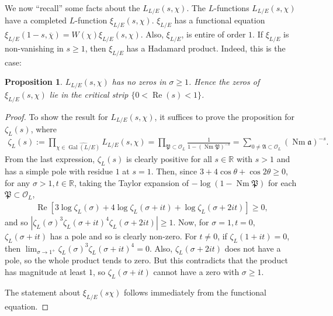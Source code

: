 \documentclass[12pt]{amsart}
\newtheorem{prop}[thm]{Proposition}
\theoremstyle{definition}
\theoremstyle{remark}
\numberwithin{equation}{section}
\newcommand{\cO}{\mathcal O}
\newcommand{\fka}{\mathfrak a}
\newcommand{\fkA}{\mathfrak{A}}
\newcommand{\fkP}{\mathfrak{P}}
\newcommand{\bbR}{\mathbb R}
\DeclareMathOperator{\norm}{Nm}
\DeclareMathOperator{\re}{Re}
\DeclareMathOperator{\Gal}{Gal}
\begin{document}
We now ``recall'' some facts about the $L_{L/E}(s,\chi)$.
The $L$-functions $L_{L/E}(s,\chi)$ have a completed $L$-function $\xi_{L/E}(s,\chi)$. $\xi_{L/E}$ has a functional equation $\xi_{L/E}(1-s, \overline{\chi}) = W(\chi) \xi_{L/E}(s,\chi)$. Also, $\xi_{L/E}$, is entire of order $1$. If $\xi_{L/E}$ is non-vanishing in $s \geq 1$, then $\xi_{L/E}$ has a Hadamard product. Indeed, this is the case:

\begin{prop} \label{prop:EasyZeroFreeRegion}
$L_{L/E}(s,\chi)$ has no zeros in $\sigma \geq 1$. Hence the zeros of $\xi_{L/E}(s,\chi)$ lie in the critical strip $\{0 < \re(s) < 1\}$. 
\end{prop}

\begin{proof}
To show the result for $L_{L/E}(s,\chi)$, it suffices to prove the proposition for $\zeta_{L}(s)$, where 
\begin{align}
\zeta_{L}(s):= \prod_{\chi \in \widehat{\Gal(L/E)}}L_{L/E}(s,\chi) = \prod_{\fkP \subset \cO_{L}} \frac{1}{1 - (\norm \fkP)^{-s}} = \sum_{0 \neq \fkA \subset \cO_{L}} (\norm \fka)^{-s}.
\end{align}
From the last expression, $\zeta_{L}(s)$ is clearly positive %
 for all $s \in \bbR$ with $s > 1$ and has a simple pole with residue $1$ at $s = 1$. Then, since $3 + 4 \cos \theta + \cos 2\theta \geq 0$, for any $\sigma > 1, t \in \bbR$, taking the Taylor expansion of $-\log(1-\norm \fkP)$ for each $\fkP \subset \cO_{L}$,
\begin{align}
\re\left[3 \log \zeta_{L}(\sigma) + 4 \log \zeta_{L}(\sigma + it) + \log\zeta_{L}(\sigma + 2it)\right] \geq 0,
\end{align}
and so $|\zeta_{L}(\sigma)^3 \zeta_{L}(\sigma + it)^4 \zeta_{L}(\sigma + 2it)| \geq 1$. Now, for $\sigma = 1, t = 0$, $\zeta_{L}(\sigma + it)$ has a pole and so is clearly non-zero. For $t \neq 0$, if $\zeta_{L}(1 + it) = 0$, then $\lim_{\sigma \to 1^{+}} \zeta_{L}(\sigma)^3 \zeta_{L}(\sigma + it)^4  = 0$. Also, $\zeta_{L}(\sigma + 2it)$ does not have a pole, so the whole product tends to zero. But this contradicts that the product has magnitude at least $1$, so $\zeta_{L}(\sigma + it)$ cannot have a zero with $\sigma \geq 1$.

The statement about $\xi_{L/E}(s\chi)$ follows immediately from the functional equation.
\end{proof}
\end{document}
